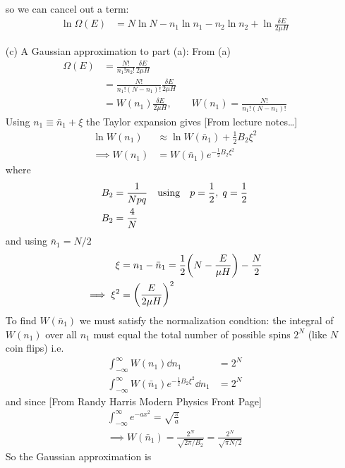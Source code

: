 \documentclass[../main.tex]{subfiles}
\begin{document}
\begin{itemize}
    so we can cancel out a term:
    \begin{align*}
        \ln \Omega(E) &= N \ln N - n_1 \ln n_1 - n_2 \ln n_2 + \ln \frac{\delta E}{2\mu H}
    \end{align*}
    \item [(c)] A Gaussian approximation to part (a): From (a)
    \begin{align*}
        \Omega(E) &= \frac{N!}{n_1! n_2!} \frac{\delta E}{2\mu H} \\
        &= \frac{N!}{n_1! (N - n_1)!} \frac{\delta E}{2\mu H} \\
        &= W(n_1) \frac{\delta E}{2\mu H}, \qquad W(n_1) = \frac{N!}{n_1! (N - n_1)!}
    \end{align*}
    Using $n_1 \equiv \bar n_1 + \xi$ the Taylor expansion gives [From lecture notes\dots]
    \begin{align*}
        \ln W(n_1) &\approx \ln W(\bar n_1) + \frac{1}{2} B_2 \xi^2 \\
        \implies W(n_1) &= W(\bar n_1) e^{-\frac{1}{2} B_2 \xi^2}
    \end{align*}
    where
    \begin{align*}
        B_2 &= \frac{1}{Npq} \qusing p = \frac{1}{2},\; q = \frac{1}{2} \\
        B_2 &= \frac{4}{N}
    \end{align*}
    and using $\bar n_1 = N/2$
    \begin{align*}
        \xi &= n_1 - \bar n_1 = \frac{1}{2} \qt(N - \frac{E}{\mu H}) - \frac{N}{2} \\
        \implies \xi^2 &= \qt(\frac{E}{2\mu H})^2
    \end{align*}
    To find $W(\bar n_1)$ we must satisfy the normalization condtion:
    the integral of $W(n_1)$ over all $n_1$ must equal the total number of possible spins $2^N$ (like $N$ coin flips) i.e.
    \begin{align*}
        \int_{-\infty}^\infty W(n_1) \dd{n_1} &= 2^N \\
        \int_{-\infty}^\infty W(\bar n_1) e^{-\frac{1}{2} B_2 \xi^2} \dd{n_1} &= 2^N 
    \end{align*}
    and since [From Randy Harris Modern Physics Front Page]
    \begin{align*}
        \int_{-\infty}^\infty e^{-ax^2} = \sqrt{\frac{\pi}{a}} \\
        \implies W(\bar n_1) = \frac{2^N}{\sqrt{2\pi/B_2}} = \frac{2^N}{\sqrt{\pi N/2}}
    \end{align*}
    So the Gaussian approximation is

\end{itemize}
\end{document}
